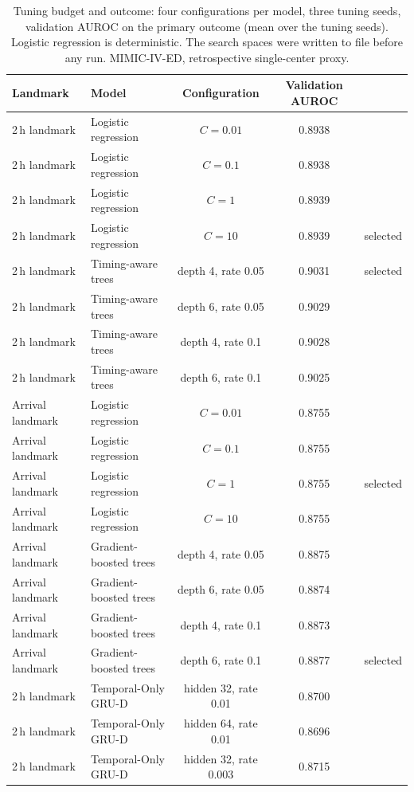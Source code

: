 \begin{table}[t]
\centering
\caption{Tuning budget and outcome: four configurations per model, three tuning seeds, validation AUROC on the primary outcome (mean over the tuning seeds). Logistic regression is deterministic. The search spaces were written to file before any run. MIMIC-IV-ED, retrospective single-center proxy.}
\label{tab:tuning}
\begin{tabular}{llccc}
\toprule
Landmark & Model & Configuration & Validation AUROC &  \\
\midrule
2\,h landmark & Logistic regression & $C = 0.01$ & 0.8938 &  \\
2\,h landmark & Logistic regression & $C = 0.1$ & 0.8938 &  \\
2\,h landmark & Logistic regression & $C = 1$ & 0.8939 &  \\
2\,h landmark & Logistic regression & $C = 10$ & 0.8939 & selected \\
2\,h landmark & Timing-aware trees & depth 4, rate 0.05 & 0.9031 & selected \\
2\,h landmark & Timing-aware trees & depth 6, rate 0.05 & 0.9029 &  \\
2\,h landmark & Timing-aware trees & depth 4, rate 0.1 & 0.9028 &  \\
2\,h landmark & Timing-aware trees & depth 6, rate 0.1 & 0.9025 &  \\
Arrival landmark & Logistic regression & $C = 0.01$ & 0.8755 &  \\
Arrival landmark & Logistic regression & $C = 0.1$ & 0.8755 &  \\
Arrival landmark & Logistic regression & $C = 1$ & 0.8755 & selected \\
Arrival landmark & Logistic regression & $C = 10$ & 0.8755 &  \\
Arrival landmark & Gradient-boosted trees & depth 4, rate 0.05 & 0.8875 &  \\
Arrival landmark & Gradient-boosted trees & depth 6, rate 0.05 & 0.8874 &  \\
Arrival landmark & Gradient-boosted trees & depth 4, rate 0.1 & 0.8873 &  \\
Arrival landmark & Gradient-boosted trees & depth 6, rate 0.1 & 0.8877 & selected \\
2\,h landmark & Temporal-Only GRU-D & hidden 32, rate 0.01 & 0.8700 &  \\
2\,h landmark & Temporal-Only GRU-D & hidden 64, rate 0.01 & 0.8696 &  \\
2\,h landmark & Temporal-Only GRU-D & hidden 32, rate 0.003 & 0.8715 &  \\

\end{tabular}
\end{table}
